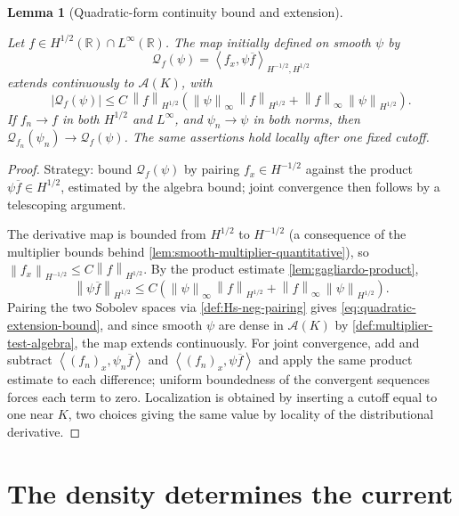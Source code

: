 \documentclass[11pt,oneside]{book}
\providecommand{\uses}[1]{}
\newtheorem{lemma}[theorem]{Lemma}
\theoremstyle{definition}
\theoremstyle{remark}
\newcommand{\R}{\mathbb R}
\newcommand{\1}{\mathbf 1}
\newcommand{\norm}[1]{\left\lVert #1\right\rVert}
\newcommand{\pair}[2]{\left\langle #1,#2\right\rangle}
\begin{document}
\begin{lemma}[Quadratic-form continuity bound and extension]\label{lem:quadratic-form-extension}
\uses{def:quadratic-form-current, def:multiplier-test-algebra}
Let $f\in H^{1/2}(\R)\cap L^\infty(\R)$. The map initially defined on smooth $\psi$ by
\[
 \mathcal Q_f(\psi)=\pair{f_x}{\psi\overline f}_{H^{-1/2},H^{1/2}}
\]
extends continuously to $\mathcal A(K)$, with
\begin{equation}
 |\mathcal Q_f(\psi)|
 \le C\,\norm{f}_{H^{1/2}}
 \left(\norm{\psi}_{\infty}\,\norm{f}_{H^{1/2}}
       +\norm{f}_{\infty}\,\norm{\psi}_{H^{1/2}}\right).
 \label{eq:quadratic-extension-bound}
\end{equation}
If $f_n\to f$ in both $H^{1/2}$ and $L^\infty$, and $\psi_n\to\psi$ in both norms, then $\mathcal Q_{f_n}(\psi_n)\to\mathcal Q_f(\psi)$. The same assertions hold locally after one fixed cutoff.
\end{lemma}

\begin{proof}
\uses{lem:gagliardo-product, lem:smooth-multiplier-quantitative, def:Hs-neg-pairing}
Strategy: bound $\mathcal Q_f(\psi)$ by pairing $f_x\in H^{-1/2}$ against the product $\psi\overline f\in H^{1/2}$, estimated by the algebra bound; joint convergence then follows by a telescoping argument.

The derivative map is bounded from $H^{1/2}$ to $H^{-1/2}$ (a consequence of the multiplier bounds behind \cref{lem:smooth-multiplier-quantitative}), so $\norm{f_x}_{H^{-1/2}}\le C\norm{f}_{H^{1/2}}$. By the product estimate \cref{lem:gagliardo-product},
\[
 \norm{\psi\overline f}_{H^{1/2}}
 \le C\left(\norm{\psi}_{\infty}\,\norm{f}_{H^{1/2}}
           +\norm{f}_{\infty}\,\norm{\psi}_{H^{1/2}}\right).
\]
Pairing the two Sobolev spaces via \cref{def:Hs-neg-pairing} gives \eqref{eq:quadratic-extension-bound}, and since smooth $\psi$ are dense in $\mathcal A(K)$ by \cref{def:multiplier-test-algebra}, the map extends continuously. For joint convergence, add and subtract $\pair{(f_n)_x}{\psi_n\overline f}$ and $\pair{(f_n)_x}{\psi\overline f}$ and apply the same product estimate to each difference; uniform boundedness of the convergent sequences forces each term to zero. Localization is obtained by inserting a cutoff equal to one near $K$, two choices giving the same value by locality of the distributional derivative.
\end{proof}


\chapter{The density determines the current}\label{chap:current}
\end{document}
